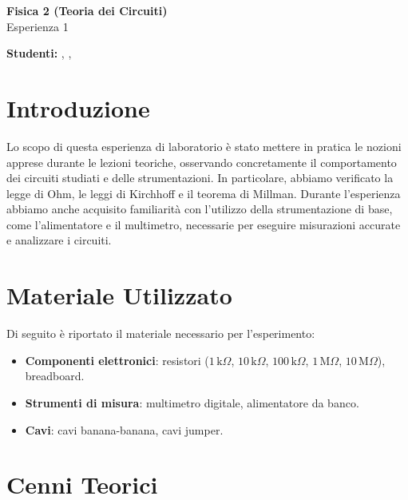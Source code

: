 



\begin{Huge}
\textsf{\textbf{Fisica 2 (Teoria dei Circuiti)}}\\
Esperienza 1
\end{Huge}

\vspace{1ex}

\textsf{\textbf{Studenti:}} ,  , 

\vspace{2ex}

\section{Introduzione}

Lo scopo di questa esperienza di laboratorio è stato mettere in pratica le nozioni apprese durante le lezioni teoriche, osservando concretamente il comportamento dei circuiti studiati e delle strumentazioni. In particolare, abbiamo verificato la legge di Ohm, le leggi di Kirchhoff e il teorema di Millman. Durante l’esperienza abbiamo anche acquisito familiarità con l’utilizzo della strumentazione di base, come l’alimentatore e il multimetro, necessarie per eseguire misurazioni accurate e analizzare i circuiti.

\section{Materiale Utilizzato}
Di seguito è riportato il materiale necessario per l’esperimento:
\begin{itemize}
    \item \textbf{Componenti elettronici}: resistori (\(1 \, \text{k}\Omega\), \(10 \, \text{k}\Omega\), \(100 \, \text{k}\Omega\), \(1 \, \text{M}\Omega\), \(10 \, \text{M}\Omega\)), breadboard.
    \item \textbf{Strumenti di misura}: multimetro digitale, alimentatore da banco.
    \item \textbf{Cavi}: cavi banana-banana, cavi jumper.
\end{itemize}

\section{Cenni Teorici}

